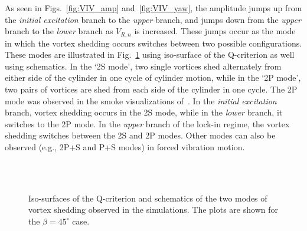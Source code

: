 As seen in Figs.~\ref{fig:VIV_amp} and~\ref{fig:VIV_yaw}, the amplitude jumps
up from the {\em initial excitation} branch to the {\em upper} branch, and
jumps down from the {\em upper} branch to the {\em lower} branch as $V_{R,n}$
is increased. These jumps occur as the mode in which the vortex shedding occurs
switches between two possible configurations. These modes are illustrated in
Fig.~\ref{fig:VIV_Q} using iso-surface of the Q-criterion as well using
schematics. In the `2S mode', two single vortices shed alternately from either
side of the cylinder in one cycle of cylinder motion, while in the `2P mode',
two pairs of vortices are shed from each side of the cylinder in one cycle.
The 2P mode was observed in the smoke visualizations of~\citet{brika1993vortex}.
In the {\em initial excitation} branch, vortex shedding occurs in the 2S mode,
while in the {\em lower} branch, it switches to the 2P mode. In the {\em
upper} branch of the lock-in regime, the vortex shedding switches between the
2S and 2P modes. Other modes can also be observed (e.g., 2P+S and P+S modes) in
forced vibration motion.
%
\begin{figure}[htb!]
   \qquad
   \\
%
   \qquad
   \\
    \caption{Iso-surfaces of the Q-criterion and schematics of the two modes of
      vortex shedding observed in the simulations. The plots are shown for the
      $\beta=45^\circ$ case.}
  \label{fig:VIV_Q}
\end{figure}
%
